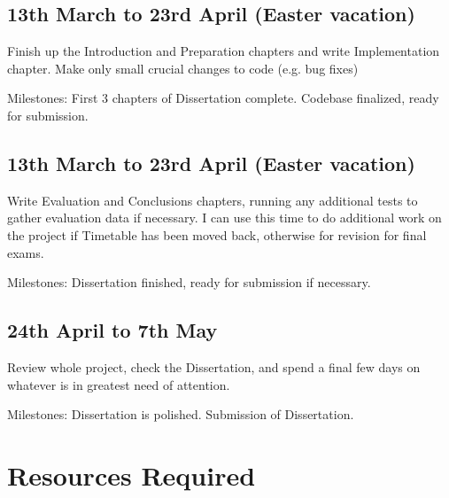 \documentclass[UKenglish, 12pt]{article}
\begin{document}
\subsection*{13th March to 23rd April (Easter vacation)}

Finish up the Introduction and Preparation chapters and write Implementation
chapter. Make only small crucial changes to code (e.g. bug fixes)

Milestones: First 3 chapters of Dissertation complete. Codebase finalized,
ready for submission. 

\subsection*{13th March to 23rd April (Easter vacation)}

Write Evaluation and Conclusions chapters, running any additional tests to gather
evaluation data if necessary. I can use this time to do additional work on the
project if Timetable has been moved back, otherwise for revision for final exams.

Milestones: Dissertation finished, ready for submission if necessary.

\subsection*{24th April to 7th May}

Review whole project, check the Dissertation, and spend a final few
days on whatever is in greatest need of attention.

Milestones: Dissertation is polished. Submission of Dissertation.

\newpage
\section*{Resources Required}
\end{document}
